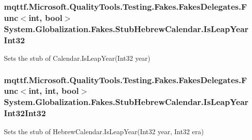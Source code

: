 \hypertarget{class_system_1_1_globalization_1_1_fakes_1_1_stub_hebrew_calendar_a3155d438a10754103caa5fc97658a271}{
\subsubsection[{Is\-Leap\-Year\-Int32}]{\setlength{\rightskip}{0pt plus 5cm}mqttf.\-Microsoft.\-Quality\-Tools.\-Testing.\-Fakes.\-Fakes\-Delegates.\-Func$<$int, bool$>$ System.\-Globalization.\-Fakes.\-Stub\-Hebrew\-Calendar.\-Is\-Leap\-Year\-Int32}}\label{class_system_1_1_globalization_1_1_fakes_1_1_stub_hebrew_calendar_a3155d438a10754103caa5fc97658a271}


Sets the stub of Calendar.\-Is\-Leap\-Year(\-Int32 year)

\hypertarget{class_system_1_1_globalization_1_1_fakes_1_1_stub_hebrew_calendar_a15fb103c5b843a3e073986691110d4de}{
\subsubsection[{Is\-Leap\-Year\-Int32\-Int32}]{\setlength{\rightskip}{0pt plus 5cm}mqttf.\-Microsoft.\-Quality\-Tools.\-Testing.\-Fakes.\-Fakes\-Delegates.\-Func$<$int, int, bool$>$ System.\-Globalization.\-Fakes.\-Stub\-Hebrew\-Calendar.\-Is\-Leap\-Year\-Int32\-Int32}}\label{class_system_1_1_globalization_1_1_fakes_1_1_stub_hebrew_calendar_a15fb103c5b843a3e073986691110d4de}


Sets the stub of Hebrew\-Calendar.\-Is\-Leap\-Year(\-Int32 year, Int32 era)

